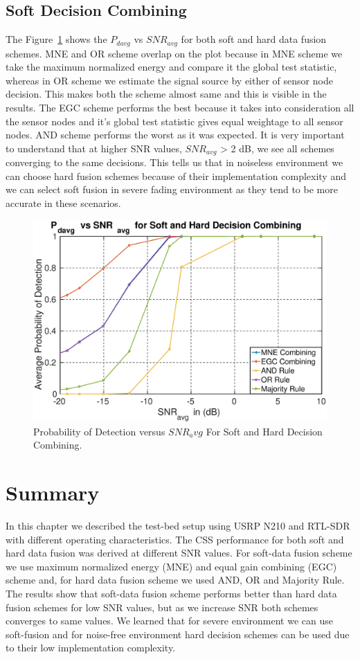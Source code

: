 \subsection{Soft Decision Combining}
The Figure~\ref{softpd} shows the $P_{davg}$ vs $SNR_{avg}$ for both soft and hard data fusion schemes. MNE and OR scheme overlap on the plot because in MNE scheme we take the maximum normalized energy and compare it the global test statistic, whereas in OR scheme we estimate the signal source by either of sensor node decision. This makes both the scheme almost same and this is visible in the results. The EGC scheme performs the best because it takes into consideration all the sensor nodes and it's global test statistic gives equal weightage to all sensor nodes. AND scheme performs the worst as it was expected. It is very important to understand that at higher SNR values, $SNR_{avg}$ > 2 dB, we see all schemes converging to the same decisions. This tells us that in noiseless environment we can choose hard fusion schemes because of their implementation complexity and we can select soft fusion in severe fading environment as they tend to be more accurate in these scenarios.
\begin{figure}[ht!]
	\centering
	\includegraphics[width=\textwidth,keepaspectratio]{images/Gill/figs/softnhardecisionpd.eps}
    \caption{Probability of Detection versus $SNR_avg$ For Soft and Hard Decision Combining.} 
\label{softpd}      
\end{figure}


\section{Summary}
In this chapter we described the test-bed setup using USRP N210 and RTL-SDR with different operating characteristics. The CSS performance for both soft and hard data fusion was derived at different SNR values. For soft-data fusion scheme we use maximum normalized energy (MNE) and equal gain combining (EGC) scheme and, for hard data fusion scheme we used AND, OR and Majority Rule. The results show that soft-data fusion scheme performs better than hard data fusion schemes for low SNR values, but as we increase SNR both schemes converges to same values. We learned that for severe environment we can use soft-fusion and for noise-free environment hard decision schemes can be used due to their low implementation complexity.
